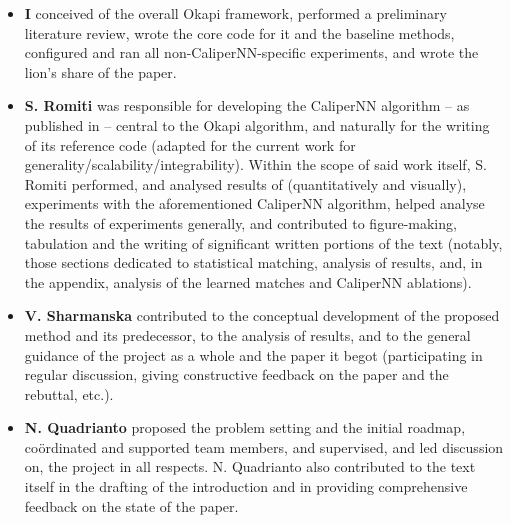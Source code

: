 %
{\renewcommand\labelitemi{}
%
\begin{itemize}
  \item 
    \textbf{I} conceived of the overall Okapi framework, performed a preliminary literature review,
    wrote the core code for it and the baseline methods, configured and ran all
    non-CaliperNN-specific experiments, and wrote the lion's share of the paper.
  \item 
    \textbf{S. Romiti} was responsible for developing the CaliperNN algorithm -- as published in
    \cite{RomInsShaQua22} -- central to the Okapi algorithm, and naturally for the writing of its
    reference code (adapted for the current work for generality/scalability/integrability).
    Within the scope of said work itself, S. Romiti performed, and analysed results of
    (quantitatively and visually), experiments with the aforementioned CaliperNN algorithm,  helped
    analyse the results of experiments generally, and contributed to figure-making, tabulation and
    the writing of significant written portions of the text (notably, those sections dedicated to
    statistical matching, analysis of results, and, in the appendix, analysis of the learned
    matches and CaliperNN ablations).
  \item 
    \textbf{V. Sharmanska} contributed to the conceptual development of the proposed method and its
    predecessor, to the analysis of results, and to the general guidance of the project as a whole
    and the paper it begot (participating in regular discussion, giving constructive feedback on
    the paper and the rebuttal, etc.).
  \item 
    \textbf{N. Quadrianto} proposed the problem setting and the initial roadmap, co\"ordinated
    and supported team members, and supervised, and led discussion on, the project in all respects.
    N. Quadrianto also contributed to the text itself in the drafting of the introduction and in
    providing comprehensive feedback on the state of the paper.
\end{itemize}
%
}
